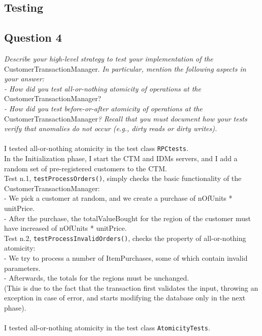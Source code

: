 \documentclass[paper=a4, fontsize=11pt]{scrartcl} %
\numberwithin{equation}{section} %
\numberwithin{figure}{section} %
\numberwithin{table}{section} %
\begin{document}
\clearpage

\subsection{Testing}

\subsection{Question 4}

\textit{Describe your high-level strategy to test your implementation of the}
CustomerTransactionManager.\textit{ In particular, mention the following aspects in your answer:\\
 - How did you test all-or-nothing atomicity of operations at the}
CustomerTransactionManager?\\
\textit{ - How did you test before-or-after atomicity of operations at the}
CustomerTransactionManager\textit{? Recall that you must document how your tests verify that
anomalies do not occur (e.g., dirty reads or dirty writes).}\\
~\\
I tested all-or-nothing atomicity in the test class \verb|RPCtests|.\\
In the Initialization phase, I start the CTM and IDMs servers, and I add a random set of pre-registered customers to the CTM.\\
Test n.1, \verb|testProcessOrders()|, simply checks the basic functionality of the CustomerTransactionManager:\\
 - We pick a customer at random, and we create a purchase of nOfUnits * unitPrice.\\
 - After the purchase, the totalValueBought for the region of the customer must have increased of nOfUnits * unitPrice.\\
Test n.2, \verb|testProcessInvalidOrders()|, checks the property of all-or-nothing atomicity:\\
 - We try to process a number of ItemPurchases, some of which contain invalid parameters.\\
 - Afterwards, the totals for the regions must be unchanged. \\
(This is due to the fact that the transaction first validates the input, throwing an exception in case of error, and starts modifying the database only in the next phase). \\ 
~\\
I tested all-or-nothing atomicity in the test class \verb|AtomicityTests|.\\
\end{document}
